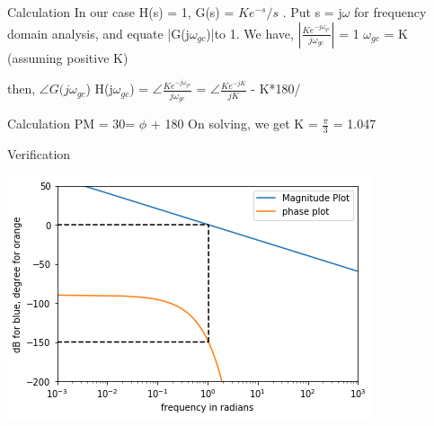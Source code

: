 \documentclass{beamer}
\begin{document}
\begin{frame}{Calculation}
In our case H(s) = 1, G(s) = ${Ke^{-s}}/s$ .
\newline
\newline
Put s =  j$\omega$ for frequency domain analysis, and equate |G(j$\omega_{gc}$)|to 1.
\newline
We have,
\newline
\newline
 $|\frac{{Ke^{-j\omega_{gc}}}}{j\omega_{gc}}|$ = 1 \implies $\omega_{gc}$ = K (assuming positive K) \newline\newline

then, $\angle G(j\omega_{gc}$) H(j$\omega_{gc}$) = $\angle \frac{{Ke^{-j\omega_{gc}}}}{j\omega_{gc}}$ =  $\angle \frac{{Ke^{-jK}}}{jK}$  
\newline\newline
{}\degree - K*180/\pi  \quad\quad\quad [=\phi]



\end{frame}
\begin{frame}{Calculation}
PM = 30\degree =  $\phi$ + 180\degree
\newline\newline
On solving, we get K = $\frac{\pi}{3}$  = 1.047
\end{frame}
\begin{frame}{Verification}
\centerline{\includegraphics[scale=.75]{graph}}

\end{frame}
\end{document}
